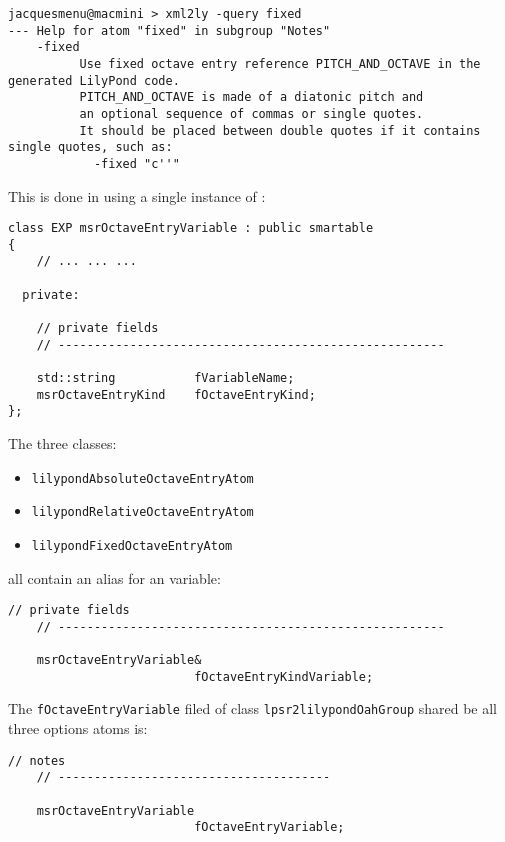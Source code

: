 \begin{lstlisting}[language=Terminal]
jacquesmenu@macmini > xml2ly -query fixed
--- Help for atom "fixed" in subgroup "Notes"
    -fixed
          Use fixed octave entry reference PITCH_AND_OCTAVE in the generated LilyPond code.
          PITCH_AND_OCTAVE is made of a diatonic pitch and
          an optional sequence of commas or single quotes.
          It should be placed between double quotes if it contains single quotes, such as:
            -fixed "c''"
\end{lstlisting}

This is done in  using a single instance of :
\begin{lstlisting}[language=CPlusPlus]
class EXP msrOctaveEntryVariable : public smartable
{
	// ... ... ...

  private:

    // private fields
    // ------------------------------------------------------

    std::string           fVariableName;
    msrOctaveEntryKind    fOctaveEntryKind;
};

\end{lstlisting}

The three classes:
\begin{itemize}
\item  {\tt lilypondAbsoluteOctaveEntryAtom}
\item  {\tt lilypondRelativeOctaveEntryAtom}
\item  {\tt lilypondFixedOctaveEntryAtom}
\end{itemize}
all contain an alias for an  variable:
\begin{lstlisting}[language=CPlusPlus]
    // private fields
    // ------------------------------------------------------

    msrOctaveEntryVariable&
                          fOctaveEntryKindVariable;
\end{lstlisting}

The {\tt fOctaveEntryVariable} filed of class   {\tt lpsr2lilypondOahGroup} shared be all three options atoms is:
\begin{lstlisting}[language=CPlusPlus]
    // notes
    // --------------------------------------

    msrOctaveEntryVariable
                          fOctaveEntryVariable;
\end{lstlisting}

